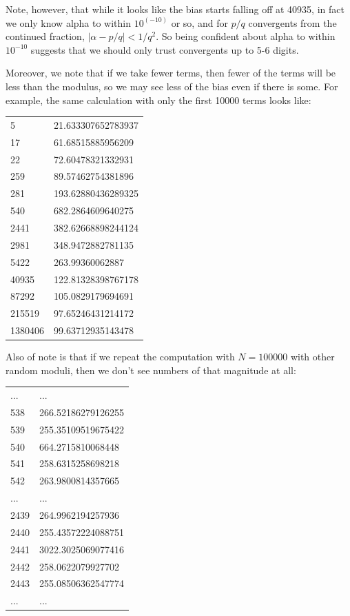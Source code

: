 \documentclass{article}
\theoremstyle{definition}
\theoremstyle{remark}
\numberwithin{equation}{section}
\begin{document}
Note, however, that while it looks like the bias starts falling off at
40935, in fact we only know alpha to within $10^(-10)$ or so, and for
$p/q$ convergents from the continued fraction,
$|\alpha - p/q| < 1/q^2$.  So being confident about alpha to within
$10^{-10}$ suggests that we should only trust convergents up to 5-6
digits.

Moreover, we note that if we take fewer terms, then fewer of the terms
will be less than the modulus, so we may see less of the bias even if
there is some.  For example, the same calculation with only the first
10000 terms looks like:

\begin{tabular}{ll}
5 & 21.633307652783937\\
17 & 61.68515885956209\\
22 & 72.60478321332931\\
259 & 89.57462754381896\\
281 & 193.62880436289325\\
540 & 682.2864609640275\\
2441 & 382.62668898244124\\
2981 & 348.9472882781135\\
5422 & 263.99360062887\\
40935 & 122.81328398767178\\
87292 & 105.0829179694691\\
215519 & 97.65246431214172\\
1380406 & 99.63712935143478
\end{tabular}

Also of note is that if we repeat the computation with $N=100000$ with
other random moduli, then we don't see numbers of that magnitude at
all:

\begin{tabular}{ll}
...&...\\
538 & 266.52186279126255\\
539 & 255.35109519675422\\
540 & 664.2715810068448\\
541 & 258.6315258698218\\
542 & 263.9800814357665\\
...&...\\
2439 & 264.9962194257936\\
2440 & 255.43572224088751\\
2441 & 3022.3025069077416\\
2442 & 258.0622079927702\\
2443 & 255.08506362547774\\
...&...\\
\end{tabular}
\end{document}
